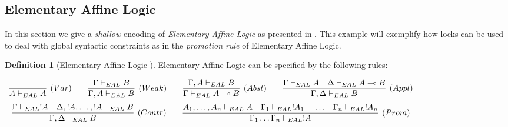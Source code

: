 \documentclass[submission,copyright,creativecommons]{eptcs}
\theoremstyle{plain}
\theoremstyle{definition}
\newtheorem{definition}{Definition}[section]
\begin{document}
\subsection{Elementary Affine Logic}
In this section we give a {\em shallow} encoding of {\em Elementary
  Affine Logic} as presented in
\cite{DBLP:conf/lics/BaillotCL07}. This example will exemplify how
locks can be used to deal with global syntactic constraints as in the
{\em promotion rule} of Elementary Affine Logic.
\begin{definition}[Elementary Affine Logic
  \cite{DBLP:conf/lics/BaillotCL07}]\label{def:elementary}
  Elementary Affine Logic can be specified by the following rules:

{\small
    \hfill$
    \begin{array}{c}
      \infer[(Var)]
      {A \VDASHEAL A}
      {}
      \qquad
      \infer[(Weak)]
      {\Gamma, A \VDASHEAL B}
      {\Gamma \VDASHEAL B}
      \qquad
      \infer[(Abst)]
      {\Gamma \VDASHEAL  A \multimap B}
      {\Gamma, A \VDASHEAL  B}
      \qquad
      \infer[(Appl)]
      {\Gamma, \Delta \VDASHEAL  B}
      {\Gamma \VDASHEAL A & \Delta \VDASHEAL  A \multimap B  }
      \\[2mm]
      \infer[(Contr)]
      { \Gamma, \Delta \VDASHEAL  B}
      {\Gamma \VDASHEAL  !A &  \Delta, !A, \ldots, !A \VDASHEAL  B }
      \qquad
      \infer[(Prom)]
      { \Gamma_1 \ldots \Gamma_n \VDASHEAL  !A}
      {A_1,\ldots,A_n \VDASHEAL  A &  \Gamma_1 \VDASHEAL  !A_1\   & \ldots &
        \Gamma_n \VDASHEAL  !A_n }
    \end{array}
    $\hfill}

\end{definition}
\end{document}
